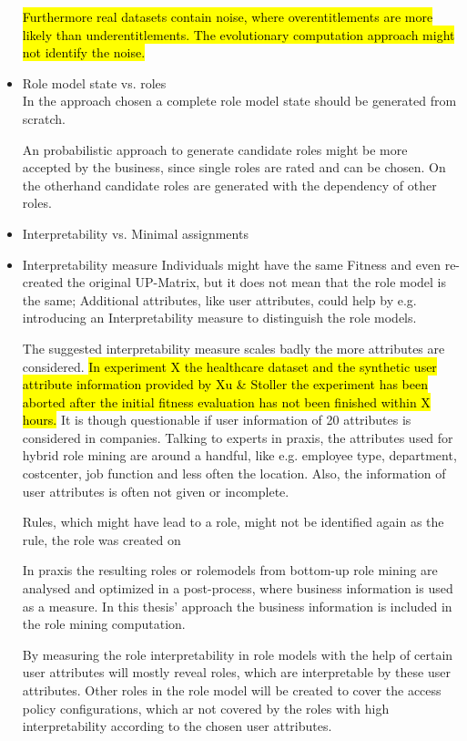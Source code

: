 \begin{itemize}
    \hl{Furthermore real datasets contain noise, where overentitlements are more likely than underentitlements. The evolutionary computation approach might not identify the noise.}
    
    \item Role model state vs. roles\\
    In the approach chosen a complete role model state should be generated from scratch. 
    
    An probabilistic approach to generate candidate roles might be more accepted by the business, since single roles are rated and can be chosen. On the otherhand candidate roles are generated with the dependency of other roles.
    
    \item Interpretability vs. Minimal assignments\\
    
    \item Interpretability measure
    Individuals might have the same Fitness and even re-created the original UP-Matrix, but it does not mean that the role model is the same; Additional attributes, like user attributes, could help by e.g. introducing an Interpretability measure to distinguish the role models.
    
    The suggested interpretability measure scales badly the more attributes are considered. \hl{In experiment X the healthcare dataset and the synthetic user attribute information provided by Xu \& Stoller the experiment has been aborted after the initial fitness evaluation has not been finished within X hours.} It is though questionable if user information of 20 attributes is considered in companies. Talking to experts in praxis, the attributes used for hybrid role mining are around a handful, like e.g. employee type, department, costcenter, job function and less often the location. Also, the information of user attributes is often not given or incomplete.
    
    Rules, which might have lead to a role, might not be identified again as the rule, the role was created on
     
    In praxis the resulting roles or rolemodels from bottom-up role mining are analysed and optimized in a post-process, where business information is used as a measure. In this thesis' approach the business information is included in the role mining computation.
    
    By measuring the role interpretability in role models with the help of certain user attributes will mostly reveal roles, which are interpretable by these user attributes. Other roles in the role model will be created to cover the access policy configurations, which ar not covered by the roles with high interpretability according to the chosen user attributes.
    

\end{itemize}
